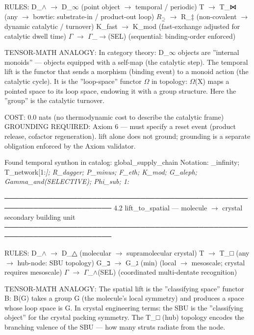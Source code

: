 \documentclass[12pt,a4paper]{article}
\begin{document}
RULES:
D\_$\land$ $\rightarrow$ D\_$\infty$          (point object $\rightarrow$ temporal / periodic)
T   $\rightarrow$ T\_⋈          (any $\rightarrow$ bowtie: substrate-in / product-out loop)
$R_{\supseteq}$ $\rightarrow$ R\_‡          (non-covalent $\rightarrow$ dynamic catalytic / turnover)
K\_fast $\rightarrow$ K\_mod     (fast-exchange adjusted for catalytic dwell time)
$\Gamma$   $\rightarrow$ $\Gamma$\_$\rightarrow$(SEL)     (sequential: binding-order enforced)

TENSOR-MATH ANALOGY:
In category theory: D\_$\infty$ objects are ''internal monoids'' --- objects
equipped with a self-map (the catalytic step). The temporal lift is
the functor that sends a morphism (binding event) to a monoid action
(the catalytic cycle). It is the ''loop-space'' functor $\Omega$ in topology:
$\Omega$(X) maps a pointed space to its loop space, endowing it with a
group structure. Here the ''group'' is the catalytic turnover.

COST: 0.0 nats (no thermodynamic cost to describe the catalytic frame)
GROUNDING REQUIRED: Axiom 6 --- must specify a reset event (product
release, cofactor regeneration). lift alone does not ground; grounding
is a separate obligation enforced by the Axiom validator.

Found temporal synthon in catalog: global\_supply\_chain
Notation: \langleD\_infinity; T\_network{[}1:\emph{{]}; R\_dagger; P\_minus; F\_eth; K\_mod; G\_aleph; Gamma\_and(SELECTIVE); Phi\_sub; 1:}\rangle

────────────────────────────────────────────────────────────────────────
4.2  lift\_to\_spatial --- molecule $\rightarrow$ crystal secondary building unit
────────────────────────────────────────────────────────────────────────

RULES:
D\_$\land$  $\rightarrow$ D\_△         (molecular $\rightarrow$ supramolecular crystal)
T    $\rightarrow$ T\_□          (any $\rightarrow$ hub-node: SBU topology)
G\_ב  $\rightarrow$ G\_ג (min)   (local $\rightarrow$ mesoscale; crystal requires mesoscale)
$\Gamma$    $\rightarrow$ $\Gamma$\_$\land$(SEL)    (coordinated multi-dentate recognition)

TENSOR-MATH ANALOGY:
The spatial lift is the ''classifying space'' functor B:
B(G) takes a group G (the molecule's local symmetry) and produces
a space whose loop space is G. In crystal engineering terms:
the SBU is the ''classifying object'' for the crystal packing symmetry.
The T\_□ (hub) topology encodes the branching valence of the SBU ---
how many struts radiate from the node.
\end{document}
